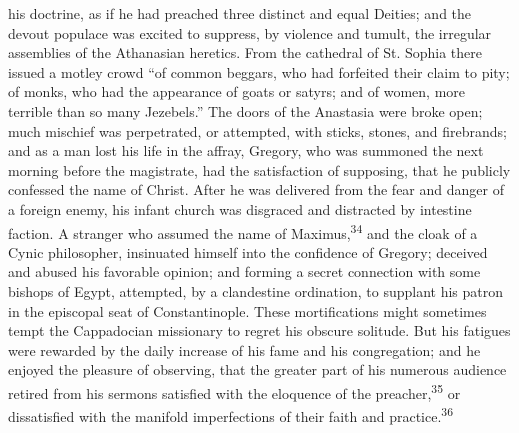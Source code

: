 his doctrine, as if he had preached three distinct and equal
Deities; and the devout populace was excited to suppress, by
violence and tumult, the irregular assemblies of the Athanasian
heretics. From the cathedral of St. Sophia there issued a motley
crowd “of common beggars, who had forfeited their claim to pity;
of monks, who had the appearance of goats or satyrs; and of
women, more terrible than so many Jezebels.” The doors of the
Anastasia were broke open; much mischief was perpetrated, or
attempted, with sticks, stones, and firebrands; and as a man lost
his life in the affray, Gregory, who was summoned the next
morning before the magistrate, had the satisfaction of supposing,
that he publicly confessed the name of Christ. After he was
delivered from the fear and danger of a foreign enemy, his infant
church was disgraced and distracted by intestine faction. A
stranger who assumed the name of Maximus,\textsuperscript{34} and the cloak of a
Cynic philosopher, insinuated himself into the confidence of
Gregory; deceived and abused his favorable opinion; and forming a
secret connection with some bishops of Egypt, attempted, by a
clandestine ordination, to supplant his patron in the episcopal
seat of Constantinople. These mortifications might sometimes
tempt the Cappadocian missionary to regret his obscure solitude.
But his fatigues were rewarded by the daily increase of his fame
and his congregation; and he enjoyed the pleasure of observing,
that the greater part of his numerous audience retired from his
sermons satisfied with the eloquence of the preacher,\textsuperscript{35} or
dissatisfied with the manifold imperfections of their faith and
practice.\textsuperscript{36}




